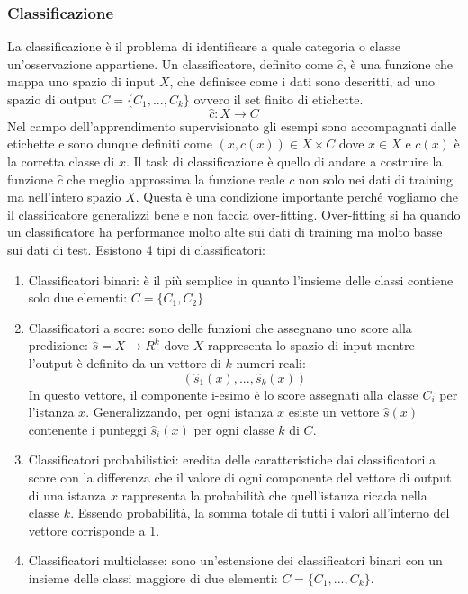 \subsubsection{Classificazione}
La classificazione è il problema di identificare a quale categoria o classe un'osservazione appartiene. Un classificatore, definito come \(\hat{c}\), è una funzione che mappa uno spazio di input \(X\), che definisce come i dati sono descritti, ad uno spazio di output \(C=\{C_1,...,C_k\}\) ovvero il set finito di etichette.
\[\hat{c}: X \rightarrow C\]
Nel campo dell'apprendimento supervisionato gli esempi sono accompagnati dalle etichette e sono dunque definiti come \((x,c(x))\in X\times C\) dove \(x \in X\) e \(c(x)\) è la corretta classe di \(x\). Il task di classificazione è quello di andare a costruire la funzione \(\hat{c}\) che meglio approssima la funzione reale \(c\) non solo nei dati di training ma nell'intero spazio \(X\). Questa è una condizione importante perché vogliamo che il classificatore generalizzi bene e non faccia over-fitting. Over-fitting si ha quando un classificatore ha performance molto alte sui dati di training ma molto basse sui dati di test.
Esistono 4 tipi di classificatori:
\begin{enumerate}
\item Classificatori binari: è il più semplice in quanto l'insieme delle classi contiene solo due elementi: \(C=\{C_1,C_2\}\)
\item Classificatori a score: sono delle funzioni che assegnano uno score alla predizione: \(\hat{s} = X\rightarrow R^k\) dove \(X\) rappresenta lo spazio di input mentre l'output è definito da un vettore di \(k\) numeri reali: 
\[(\hat{s}_1 (x),...,\hat{s}_k(x))\]
In questo vettore, il componente i-esimo è lo score assegnati alla classe \(C_i\) per l'istanza \(x\). Generalizzando, per ogni istanza \(x\) esiste un vettore \(\hat{s}(x)\) contenente i punteggi \(\hat{s}_i(x)\) per ogni classe \(k\) di \(C\).
\item Classificatori probabilistici: eredita delle caratteristiche dai classificatori a score con la differenza che il valore di ogni componente del vettore di output di una istanza \(x\) rappresenta la probabilità che quell'istanza ricada nella classe \(k\). Essendo probabilità, la somma totale di tutti i valori all'interno del vettore corrisponde a 1.
\item Classificatori multiclasse: sono un'estensione dei classificatori binari con un insieme delle classi maggiore di due elementi: \(C=\{C_1,...,C_k\}\). 
\end{enumerate}

